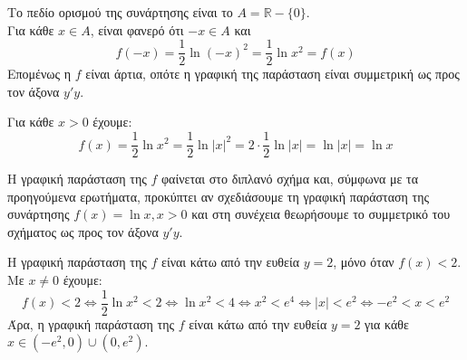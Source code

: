 \begin{alist}
\item Το πεδίο ορισμού της συνάρτησης είναι το $A = \mathbb{R} - \{0\}$. \\
Για κάθε $x \in A$, είναι φανερό ότι $-x \in A$ και
\[f(-x) = \frac{1}{2}\ln(-x)^2 = \frac{1}{2}\ln x^2 = f(x)\]
Επομένως η $f$ είναι άρτια, οπότε η γραφική της παράσταση είναι συμμετρική ως προς τον άξονα $y'y$.
\item Για κάθε $x>0$ έχουμε:
\[f(x) = \frac{1}{2}\ln x^2 = \frac{1}{2}\ln|x|^2 = 2 \cdot \frac{1}{2}\ln|x| = \ln|x| = \ln x\]
\item Η γραφική παράσταση της $f$ φαίνεται στο διπλανό σχήμα και, σύμφωνα με τα προηγούμενα ερωτήματα, προκύπτει αν σχεδιάσουμε τη γραφική παράσταση της συνάρτησης $f(x) = \ln x, x > 0$ και στη συνέχεια θεωρήσουμε το συμμετρικό του σχήματος ως προς τον άξονα $y'y$.
\begin{center}
\end{center}
\item Η γραφική παράσταση της $f$ είναι κάτω από την ευθεία $y = 2$, μόνο όταν $f(x) < 2$. Με $x \neq 0$ έχουμε:
\[f(x) < 2 \Leftrightarrow \frac{1}{2}\ln x^2 < 2 \Leftrightarrow \ln x^2 < 4 \Leftrightarrow x^2 < e^4 \Leftrightarrow |x| < e^2 \Leftrightarrow -e^2 < x < e^2\]
Άρα, η γραφική παράσταση της $f$ είναι κάτω από την ευθεία $y=2$ για κάθε $x \in (-e^2, 0) \cup (0, e^2)$.
\end{alist}

